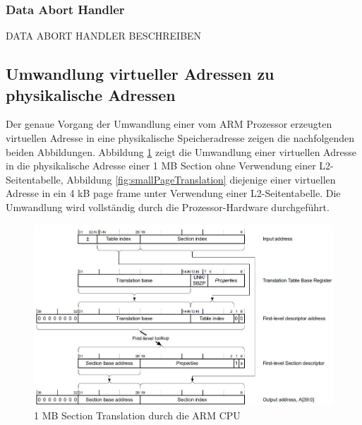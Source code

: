 \vspace{2cm}
\subsubsection{Data Abort Handler}
DATA ABORT HANDLER BESCHREIBEN
\vspace{2cm}

\subsection{Umwandlung virtueller Adressen zu physikalische Adressen}

Der genaue Vorgang der Umwandlung einer vom ARM Prozessor erzeugten virtuellen Adresse in eine physikalische Speicheradresse zeigen die nachfolgenden beiden Abbildungen. Abbildung  \ref{fig:sectionTranslation} zeigt die Umwandlung einer virtuellen Adresse in die physikalische Adresse einer 1 MB Section ohne Verwendung einer L2-Seitentabelle, Abbildung \ref{fig:smallPageTranslation} diejenige einer virtuellen Adresse in ein 4 kB page frame unter Verwendung einer L2-Seitentabelle.   Die Umwandlung wird vollständig durch die Prozessor-Hardware durchgeführt.\\


\begin{figure}[H]
	\includegraphics[scale=0.8]{figures/sectionTranslation}
	\caption{1 MB Section Translation durch die ARM CPU \cite[S. B3-1335]{ARM:ARM}}
	\label{fig:sectionTranslation}
\end{figure}

